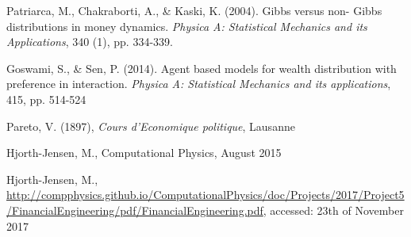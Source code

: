 \documentclass[11pt,a4paper,titlepage]{article}
\begin{document}
 


 



\begin{flushleft}
\begin{thebibliography}{}

\singlespacing
\small

  Patriarca, M., Chakraborti, A., \& Kaski, K. (2004). Gibbs versus non-
  Gibbs distributions in money dynamics. \textit{Physica A: Statistical
  Mechanics and its Applications}, 340 (1), pp. 334-339.
 
  Goswami, S., \& Sen, P. (2014). 
  Agent based models for wealth distribution with preference in interaction. 
  \textit{Physica A: Statistical Mechanics and its applications}, 415, pp. 514-524
  
  Pareto, V. (1897), \textit{Cours d'Economique politique}, Lausanne
  

  Hjorth-Jensen, M.,
  Computational Physics,
  August 2015

  Hjorth-Jensen, M.,
  \url{http://compphysics.github.io/ComputationalPhysics/doc/Projects/2017/Project5/FinancialEngineering/pdf/FinancialEngineering.pdf},
  accessed: 23th of November 2017

  

  
\end{thebibliography}
\end{flushleft}
\end{document}
